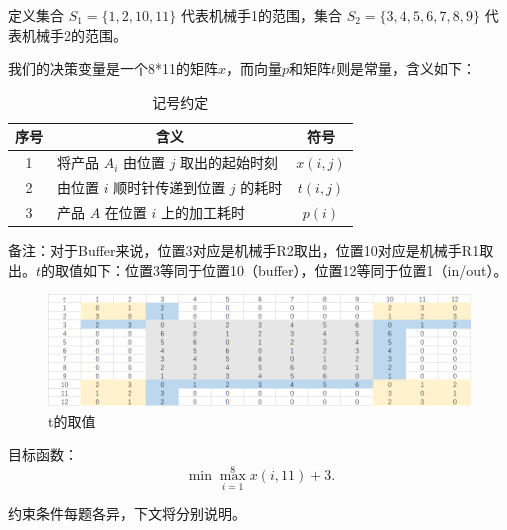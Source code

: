 \documentclass{ctexart}
\begin{document}
{{        定义集合 $S_1 = \{ 1, 2, 10, 11 \} $ 代表机械手1的范围，集合 $S_2 = \{ 3, 4, 5, 6, 7, 8, 9 \} $ 代表机械手2的范围。

        我们的决策变量是一个8*11的矩阵$x$，而向量$p$和矩阵$t$则是常量，含义如下：
        
        \begin{table}[H]
        \centering
        \caption{记号约定}
        \begin{tabular}{@{}clc@{}}
        \toprule
        序号 & \multicolumn{1}{c}{含义} & 符号 \\ \midrule
        1 & 将产品 $A_i$ 由位置 $j$ 取出的起始时刻     & $x(i, j)$    \\ 
        2 & 由位置 $i$ 顺时针传递到位置 $j$ 的耗时  & $t(i, j)$   \\
        3 & 产品 $A$ 在位置 $i$ 上的加工耗时   & $p(i)$ \\ \bottomrule
        \end{tabular}
        \end{table}
        备注：对于Buffer来说，位置3对应是机械手R2取出，位置10对应是机械手R1取出。$t$的取值如下：位置3等同于位置10（buffer），位置12等同于位置1（in/out）。
        \begin{figure}[H]
            \centering
            \includegraphics[width = 0.9\linewidth]{t.png}
            \caption{t的取值}
        \end{figure}

        目标函数：$$\min { \max_{i=1}^{8} { x(i, 11) } + 3}.$$

        约束条件每题各异，下文将分别说明。
            
    }

    \clearpage
}
\end{document}
